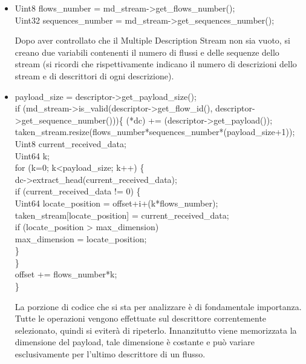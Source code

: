 \begin{itemize}
 \item \begin{code}
Uint8 flows\_number = md\_stream->get\_flows\_number();\\
Uint32 sequences\_number = md\_stream->get\_sequences\_number();\\
\end{code}
Dopo aver controllato che il Multiple Description Stream non sia vuoto, si creano due variabili contenenti il numero di flussi e delle sequenze dello stream (si ricordi che rispettivamente indicano il numero di descrizioni dello stream e di descrittori di ogni descrizione).

 \item \begin{code}
payload\_size = descriptor->get\_payload\_size();\\
if (md\_stream->is\_valid(descriptor->get\_flow\_id(), descriptor->get\_sequence\_number()))\{
	(*dc) += (descriptor->get\_payload());\\
	taken\_stream.resize(flows\_number*sequences\_number*(payload\_size+1));\\
	Uint8 current\_received\_data;\\
	Uint64 k;\\
	for (k=0; k<payload\_size; k++) \{\\
		dc->extract\_head(current\_received\_data);\\
		if (current\_received\_data != 0) \{\\
			Uint64 locate\_position = offset+i+(k*flows\_number);\\
			taken\_stream[locate\_position] = current\_received\_data;\\
			if (locate\_position > max\_dimension)\\
			max\_dimension = locate\_position;\\
		\}\\
	\}\\
	offset += flows\_number*k;\\
\}\\
\end{code}
La porzione di codice che si sta per analizzare \`e di fondamentale importanza. Tutte le operazioni vengono effettuate sul descrittore correntemente selezionato, quindi si eviter\`a di ripeterlo. Innanzitutto viene memorizzata la dimensione del payload, tale dimensione \`e costante e pu\`o variare esclusivamente per l'ultimo descrittore di un flusso.
\begin{notabene}

\end{notabene}
\end{itemize}
